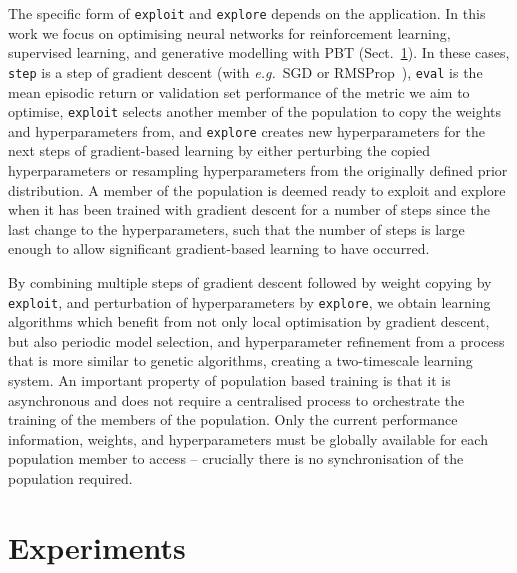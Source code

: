 \documentclass{article} %
\newcommand{\sref}[1]{Sect.~\ref{#1}}
\def\eg{\emph{e.g.}}
\newcommand{\pbtexploit}{\texttt{exploit}\xspace}
\newcommand{\pbtexplore}{\texttt{explore}\xspace}
\newcommand{\pbtstep}{\texttt{step}\xspace}
\newcommand{\pbteval}{\texttt{eval}\xspace}
\begin{document}
The specific form of \pbtexploit and \pbtexplore depends on the application. In this work we focus on optimising neural networks for reinforcement learning, supervised learning, and generative modelling with PBT (\sref{sec:exp}).
In these cases, \pbtstep is a step of gradient descent (with \eg~SGD or RMSProp~\citep{tieleman2012lecture}), \pbteval is the mean episodic return or validation set performance of the metric we aim to optimise, \pbtexploit selects another member of the population to copy the weights and hyperparameters from, and \pbtexplore creates new hyperparameters for the next steps of gradient-based learning by either perturbing the copied hyperparameters or resampling hyperparameters from the originally defined prior distribution. A member of the population is deemed ready to exploit and explore when it has been trained with gradient descent for a number of steps since the last change to the hyperparameters, such that the number of steps is large enough to allow significant gradient-based learning to have occurred.

By combining multiple steps of gradient descent followed by weight copying by \pbtexploit, and perturbation of hyperparameters by \pbtexplore, we obtain learning algorithms which benefit from not only local optimisation by gradient descent, but also periodic model selection, and hyperparameter refinement from a process that is more similar to genetic algorithms, creating a two-timescale learning system.
%
An important property of population based training is that it is asynchronous and does not require a centralised process to orchestrate the training of the members of the population. Only the current performance information, weights, and hyperparameters must be globally available for each population member to access -- crucially there is no synchronisation of the population required.



\section{Experiments}\label{sec:exp}
\end{document}
